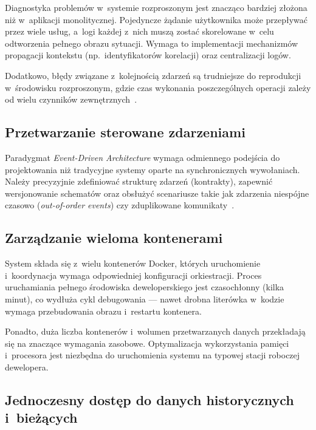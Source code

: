 Diagnostyka problemów w~systemie rozproszonym jest znacząco bardziej złożona niż w~aplikacji monolitycznej.
Pojedyncze żądanie użytkownika może przepływać przez wiele usług, a~logi każdej z~nich muszą zostać skorelowane
w~celu odtworzenia pełnego obrazu sytuacji.
Wymaga to implementacji mechanizmów propagacji kontekstu (np.\ identyfikatorów korelacji) oraz centralizacji logów.

Dodatkowo, błędy związane z~kolejnością zdarzeń są trudniejsze do reprodukcji w~środowisku rozproszonym, gdzie czas
wykonania poszczególnych operacji zależy od wielu czynników zewnętrznych~\cite{open_telemetry}.

\subsection{Przetwarzanie sterowane zdarzeniami}
\label{subsec:event_driven_challenges}

Paradygmat \textit{Event-Driven Architecture} wymaga odmiennego podejścia do projektowania niż tradycyjne systemy
oparte na synchronicznych wywołaniach.
Należy precyzyjnie zdefiniować strukturę zdarzeń (kontrakty), zapewnić wersjonowanie schematów oraz obsłużyć
scenariusze takie jak zdarzenia niespójne czasowo (\textit{out-of-order events}) czy zduplikowane komunikaty~\cite{at_least_once}.

\subsection{Zarządzanie wieloma kontenerami}
\label{subsec:zarzadzanie_kontenerami}

System składa się z~wielu kontenerów Docker, których uruchomienie i~koordynacja wymaga odpowiedniej konfiguracji
orkiestracji.
Proces uruchamiania pełnego środowiska deweloperskiego jest czasochłonny (kilka minut), co wydłuża cykl
debugowania --- nawet drobna literówka w~kodzie wymaga przebudowania obrazu i~restartu kontenera.

Ponadto, duża liczba kontenerów i~wolumen przetwarzanych danych przekładają się na znaczące wymagania zasobowe.
Optymalizacja wykorzystania pamięci i~procesora jest niezbędna do uruchomienia systemu na typowej stacji roboczej
dewelopera.

\subsection[Jednoczesny dostęp do danych historycznych i bieżących]{Jednoczesny dostęp do danych historycznych i~bieżących}
\label{subsec:dostep_danych}


